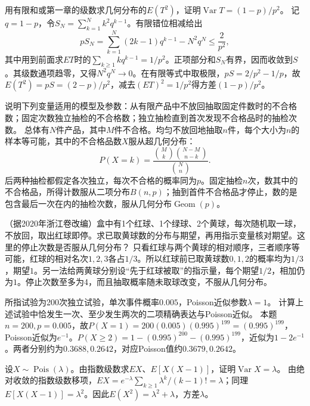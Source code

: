 用有限和或第一章的级数求几何分布的\(E(T^2)\)，证明\(\operatorname{Var}T=(1-p)/p^2\)。
\solutionanswer
记\(q=1-p\)，令\(S_N=\sum_{k=1}^Nk^2q^{k-1}\)。有限错位相减给出
\[
 pS_N=\sum_{k=1}^N(2k-1)q^{k-1}-N^2q^N\le\frac2{p^2},
\]
其中用到前面求\(ET\)时的\(\sum_{k\ge1}kq^{k-1}=1/p^2\)。正项部分和\(S_N\)有界，因而收敛到\(S\)。其级数通项趋零，又得\(N^2q^N\to0\)。在有限等式中取极限，\(pS=2/p^2-1/p\)，故\(E(T^2)=pS=(2-p)/p^2\)，减去\((ET)^2=1/p^2\)得方差\((1-p)/p^2\)。


说明下列变量适用的模型及参数：从有限产品中不放回抽取固定件数时的不合格数；固定次数独立抽检的不合格数；独立抽检直到首次发现不合格品时的抽检次数。
\solutionanswer
总体有\(N\)件产品，其中\(M\)件不合格。均匀不放回地抽取\(n\)件，每个大小为\(n\)的样本等可能，其中的不合格品数\(X\)服从超几何分布：
\[
 P(X=k)=\frac{\binom Mk\binom{N-M}{n-k}}{\binom Nn}.
\]
后两种抽检都假定各次独立，每次不合格的概率同为\(p\)。固定抽检\(n\)次，数其中的不合格品，所得计数服从二项分布\(B(n,p)\)；抽到首件不合格品才停止，数的是包含最后一次在内的抽检次数，服从几何分布\(\operatorname{Geom}(p)\)。


（据2020年浙江卷改编）盒中有1个红球、1个绿球、2个黄球，每次随机取一球，不放回，取出红球即停。求已取黄球数的分布与期望，再用指示变量核对期望。这里的停止次数是否服从几何分布？
\solutionanswer
只看红球与两个黄球的相对顺序，三者顺序等可能，红球的相对名次\(1,2,3\)各占\(1/3\)。所以红球前已取黄球数\(0,1,2\)的概率均为\(1/3\)，期望\(1\)。另一法给两黄球分别设“先于红球被取”的指示量，每个期望\(1/2\)，相加仍为\(1\)。停止次数至多为4，而且抽取概率随未取球改变，不服从几何分布。


所指试验为200次独立试验，单次事件概率\(0.005\)，Poisson近似参数\(\lambda=1\)。
计算上述试验中恰发生一次、至少发生两次的二项精确表达与Poisson近似。
\solutionanswer
本题\(n=200,p=0.005\)，故\(P(X=1)=200(0.005)(0.995)^{199}=(0.995)^{199}\)，Poisson近似为\(e^{-1}\)。\(P(X\ge2)=1-(0.995)^{200}-(0.995)^{199}\)，近似为\(1-2e^{-1}\)。两者分别约为\(0.3688,0.2642\)，对应Poisson值约\(0.3679,0.2642\)。


设\(X\sim\operatorname{Pois}(\lambda)\)。由指数级数求\(EX\)、\(E[X(X-1)]\)，证明\(\operatorname{Var}X=\lambda\)。
\solutionanswer
由绝对收敛的指数级数移项，\(EX=e^{-\lambda}\sum_{k\ge1}\lambda^k/(k-1)!=\lambda\)；同理\(E[X(X-1)]=\lambda^2\)。因此\(E(X^2)=\lambda^2+\lambda\)，方差\(\lambda\)。


